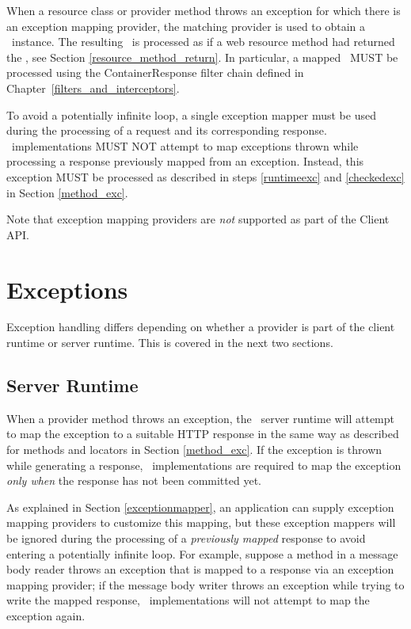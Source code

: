 When a resource class or provider method throws an exception for which there is an exception mapping provider, the matching provider is used to obtain a \Response\ instance. The resulting \Response\ is processed as if a web resource method had returned the \Response, see Section \ref{resource_method_return}. In particular, a mapped \Response\ MUST be processed using the ContainerResponse filter chain defined in  Chapter~\ref{filters_and_interceptors}.

To avoid a potentially infinite loop, a single exception mapper must be used during the processing of a request and its corresponding response. \jaxrs\ implementations MUST NOT attempt to map exceptions thrown while processing a response previously mapped from an exception. Instead, this exception MUST be processed as described in steps \ref{runtimeexc} and \ref{checkedexc} in Section \ref{method_exc}.

Note that exception mapping providers are {\em not} supported as part of the Client API.

\section{Exceptions}
\label{exceptions_providers}

Exception handling differs depending on whether a provider is part of the client runtime or server runtime. This is covered in the next two sections.

\subsection{Server Runtime}
\label{exceptions_providers_server}

When a provider method throws an exception, the \jaxrs\ server runtime will attempt to map the exception to a suitable HTTP response in the same way as described for methods and locators in Section \ref{method_exc}. If the exception is thrown
while generating a response, \jaxrs\ implementations are required to map the exception {\em only when} the response has not been committed yet.

As explained in Section \ref{exceptionmapper}, an application can supply exception mapping providers to customize this mapping, but these exception mappers will be ignored during the processing of a {\em previously mapped} response to avoid entering a potentially infinite loop. For example, suppose a method in a message body reader throws an exception that is mapped to a response via an exception mapping provider; if the message body writer throws an exception while trying to write the mapped response, \jaxrs\ implementations will not attempt to map the exception again.

